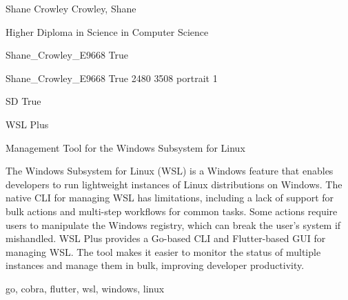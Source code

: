 
\begingroup{}\relax



\def\Key{Shane_Crowley_E9668}

{Shane Crowley}
{Crowley, Shane}

{Higher Diploma in Science in Computer Science}

{Shane_Crowley_E9668}
{True}

{Shane_Crowley_E9668}
{True}
{2480}
{3508}
{portrait}
{1}

{SD}
{True}

{WSL Plus}

{Management Tool for the Windows Subsystem for Linux}

{The Windows Subsystem for Linux (WSL) is a Windows feature that enables developers to run lightweight instances of Linux distributions on Windows. The native CLI for managing WSL has limitations, including a lack of support for bulk actions and multi-step workflows for common tasks. Some actions require users to manipulate the Windows registry, which can break the user's system if mishandled. WSL Plus provides a Go-based CLI and Flutter-based GUI for managing WSL. The tool makes it easier to monitor the status of multiple instances and manage them in bulk, improving developer productivity.}

{go, cobra, flutter, wsl, windows, linux}

